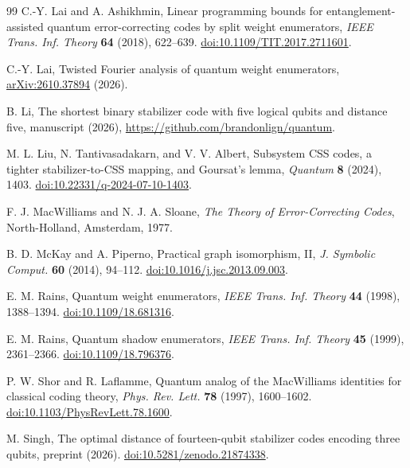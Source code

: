 \documentclass[11pt]{article}
\theoremstyle{definition}
\theoremstyle{remark}
\begin{document}
\begin{thebibliography}{99}
C.-Y. Lai and A. Ashikhmin,
Linear programming bounds for entanglement-assisted quantum
error-correcting codes by split weight enumerators,
\emph{IEEE Trans. Inf. Theory} \textbf{64} (2018), 622--639.
\href{https://doi.org/10.1109/TIT.2017.2711601}{doi:10.1109/TIT.2017.2711601}.

C.-Y. Lai, Twisted Fourier analysis of quantum weight enumerators,
\href{https://arxiv.org/abs/2610.37894}{arXiv:2610.37894} (2026).

B. Li, The shortest binary stabilizer code with five logical qubits and
distance five, manuscript (2026), \url{https://github.com/brandonlign/quantum}.

M. L. Liu, N. Tantivasadakarn, and V. V. Albert,
Subsystem CSS codes, a tighter stabilizer-to-CSS mapping, and Goursat's lemma,
\emph{Quantum} \textbf{8} (2024), 1403.
\href{https://doi.org/10.22331/q-2024-07-10-1403}{doi:10.22331/q-2024-07-10-1403}.

F. J. MacWilliams and N. J. A. Sloane,
\emph{The Theory of Error-Correcting Codes},
North-Holland, Amsterdam, 1977.

B. D. McKay and A. Piperno,
Practical graph isomorphism, II,
\emph{J. Symbolic Comput.} \textbf{60} (2014), 94--112.
\href{https://doi.org/10.1016/j.jsc.2013.09.003}{doi:10.1016/j.jsc.2013.09.003}.

E. M. Rains, Quantum weight enumerators,
\emph{IEEE Trans. Inf. Theory} \textbf{44} (1998), 1388--1394.
\href{https://doi.org/10.1109/18.681316}{doi:10.1109/18.681316}.

E. M. Rains, Quantum shadow enumerators,
\emph{IEEE Trans. Inf. Theory} \textbf{45} (1999), 2361--2366.
\href{https://doi.org/10.1109/18.796376}{doi:10.1109/18.796376}.

P. W. Shor and R. Laflamme,
Quantum analog of the MacWilliams identities for classical coding theory,
\emph{Phys. Rev. Lett.} \textbf{78} (1997), 1600--1602.
\href{https://doi.org/10.1103/PhysRevLett.78.1600}{doi:10.1103/PhysRevLett.78.1600}.

M. Singh, The optimal distance of fourteen-qubit stabilizer codes
encoding three qubits, preprint (2026).
\href{https://doi.org/10.5281/zenodo.21874338}{doi:10.5281/zenodo.21874338}.

\end{thebibliography}
\end{document}
